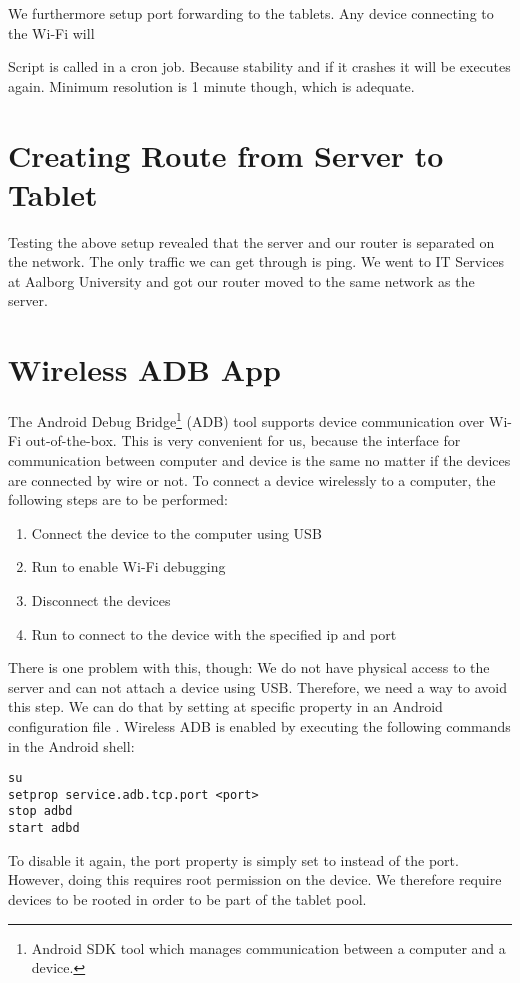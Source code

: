 We furthermore setup port forwarding to the tablets. Any device connecting to the Wi-Fi will 

Script is called in a cron job. Because stability and if it crashes it will be executes again. Minimum resolution is 1 minute though, which is adequate. 

\section{Creating Route from Server to Tablet}
Testing the above setup revealed that the server and our router is separated on the network. The only traffic we can get through is ping. We went to IT Services at Aalborg University and got our router moved to the same network as the server. 

\section{Wireless ADB App}
The Android Debug Bridge\footnote{Android SDK tool which manages communication between a computer and a device.} (ADB) tool supports device communication over Wi-Fi out-of-the-box\parencite{AndroidADB}. This is very convenient for us, because the interface for communication between computer and device is the same no matter if the devices are connected by wire or not. To connect a device wirelessly to a computer, the following steps are to be performed:
\begin{enumerate}
  \item Connect the device to the computer using USB
  \item Run  to enable Wi-Fi debugging
  \item Disconnect the devices
  \item Run  to connect to the device with the specified ip and port
\end{enumerate}
There is one problem with this, though: We do not have physical access to the server and can not attach a device using USB\@. Therefore, we need a way to avoid this step. We can do that by setting at specific property in an Android configuration file \parencite{stackoverflow-adb-tcp}. Wireless ADB is enabled by executing the following commands in the Android shell:
\begin{lstlisting}
su
setprop service.adb.tcp.port <port>
stop adbd
start adbd
\end{lstlisting}
To disable it again, the port property is simply set to  instead of the port. However, doing this requires root permission on the device. We therefore require devices to be rooted in order to be part of the tablet pool.

